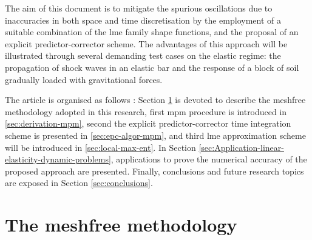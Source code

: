 \documentclass[preprint,12pt,a4paper]{elsarticle}
\begin{document}
The aim of this document is to mitigate the spurious oscillations due to
inaccuracies in both space and time discretisation by the employment of a
suitable combination of the \acrshort{lme} family shape functions, and the proposal of an explicit predictor-corrector scheme. The advantages of
this approach will be illustrated through several demanding test cases on the elastic regime: the
propagation of shock waves in an elastic bar and the response of a block of soil gradually loaded with gravitational forces.

The article is organised as follows : Section \ref{sec:meshfree-methodology}
is devoted to describe the meshfree methodology adopted in this
research, first \acrshort{mpm} procedure is introduced in
\ref{sec:derivation-mpm}, second the explicit predictor-corrector
time integration scheme is presented in \ref{sec:epc-algor-mpm}, and
third \acrshort{lme} approximation scheme will be introduced in
\ref{sec:local-max-ent}. In Section
\ref{sec:Application-linear-elasticity-dynamic-problems}, applications to prove the numerical accuracy of the proposed approach are
presented. Finally, conclusions and future research topics are exposed in Section \ref{sec:conclusions}.


\section{The meshfree methodology}
\label{sec:meshfree-methodology}
\end{document}
